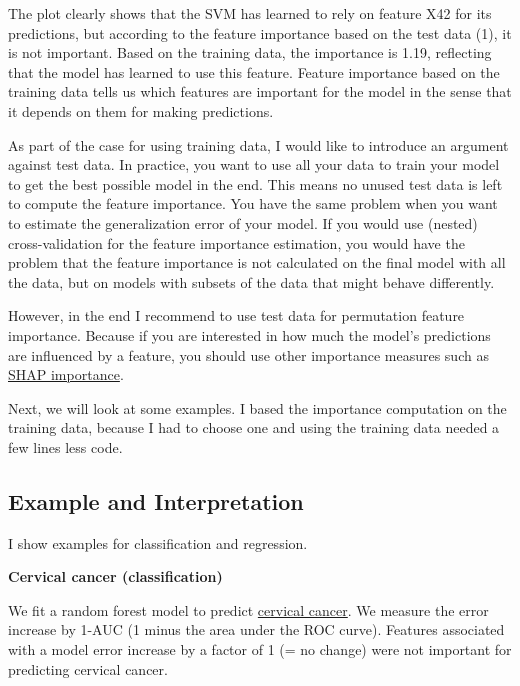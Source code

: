 \documentclass[
  11pt,
]{scrbook}
\begin{document}
The plot clearly shows that the SVM has learned to rely on feature X42 for its predictions, but according to the feature importance based on the test data (1), it is not important.
Based on the training data, the importance is 1.19, reflecting that the model has learned to use this feature.
Feature importance based on the training data tells us which features are important for the model in the sense that it depends on them for making predictions.

As part of the case for using training data, I would like to introduce an argument against test data.
In practice, you want to use all your data to train your model to get the best possible model in the end.
This means no unused test data is left to compute the feature importance.
You have the same problem when you want to estimate the generalization error of your model.
If you would use (nested) cross-validation for the feature importance estimation, you would have the problem that the feature importance is not calculated on the final model with all the data, but on models with subsets of the data that might behave differently.

However, in the end I recommend to use test data for permutation feature importance.
Because if you are interested in how much the model's predictions are influenced by a feature, you should use other importance measures such as \protect\hyperlink{shap-feature-importance}{SHAP importance}.

Next, we will look at some examples.
I based the importance computation on the training data, because I had to choose one and using the training data needed a few lines less code.

\hypertarget{example-and-interpretation}{%
\subsection{Example and Interpretation}\label{example-and-interpretation}}

I show examples for classification and regression.

\textbf{Cervical cancer (classification)}

We fit a random forest model to predict \protect\hyperlink{cervical}{cervical cancer}.
We measure the error increase by 1-AUC (1 minus the area under the ROC curve).
Features associated with a model error increase by a factor of 1 (= no change) were not important for predicting cervical cancer.
\end{document}
